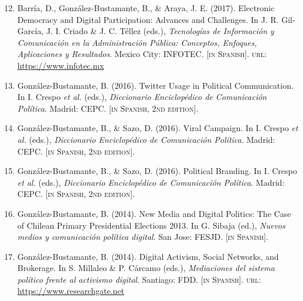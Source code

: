 \documentclass[letterpaper,margin]{res}
\newenvironment{benumerate}[1]{
    \let\oldItem\item
    \def\item{\addtocounter{enumi}{-2}\oldItem}
    \begin{enumerate}
    \setcounter{enumi}{#1}
    \addtocounter{enumi}{1}
}{
    \end{enumerate}
}
\begin{document}
\begin{resume}
\begin{benumerate}{11}
\item{\small Barr\'ia, D., Gonz\'alez-Bustamante, B., \& Araya, J. E. (2017). Electronic Democracy and Digital Participation: Advances and Challenges. In J. R. Gil-Garc\'ia, J. I. Criado \&  J. C. T\'ellez (eds.), {\itshape Tecnolog\'ias de Informaci\'on y Comunicaci\'on en la Administraci\'on P\'ublica: Conceptos, Enfoques, Aplicaciones y Resultados}. Mexico City: INFOTEC. {\footnotesize \scshape [in Spanish]}. {\scshape url}: \href{https://www.infotec.mx/es_mx/infotec/tic_en_la_administracion_publica}{https://www.infotec.mx}}\vspace{1mm}

\item{\small Gonz\'alez-Bustamante, B. (2016). Twitter Usage in Political Communication. In I. Crespo {\itshape et al.} (eds.), {\itshape Diccionario Enciclop\'edico de Comunicaci\'on Pol\'itica}. Madrid: CEPC. {\footnotesize \scshape [in Spanish, 2nd edition]}.}\vspace{1mm}

\item{\small Gonz\'alez-Bustamante, B., \& Sazo, D. (2016). Viral Campaign. In I. Crespo {\itshape et al.} (eds.), {\itshape Diccionario Enciclop\'edico de Comunicaci\'on Pol\'itica}. Madrid: CEPC. {\footnotesize \scshape [in Spanish, 2nd edition]}.}\vspace{1mm}

\item{\small Gonz\'alez-Bustamante, B., \& Sazo, D. (2016). Political Branding. In I. Crespo {\itshape et al.} (eds.), {\itshape Diccionario Enciclop\'edico de Comunicaci\'on Pol\'itica}. Madrid: CEPC. {\footnotesize \scshape [in Spanish, 2nd edition]}.}\vspace{1mm}

\item{\small Gonz\'alez-Bustamante, B. (2014). New Media and Digital Politics: The Case of Chilean Primary Presidential Elections 2013. In G. Sibaja (ed.), {\itshape Nuevos medios y comunicaci\'on pol\'itica digital}. San Jose: FESJD. {\footnotesize \scshape [in Spanish]}.}\vspace{1mm}

\item{\small Gonz\'alez-Bustamante, B. (2014). Digital Activism, Social Networks, and Brokerage. In S. Millaleo \& P. C\'arcamo (eds.), {\itshape Mediaciones del sistema pol\'itico frente al activismo digital}. Santiago: FDD. {\footnotesize \scshape [in Spanish]}. {\scshape url}: \href{https://www.researchgate.net/publication/321992867_Activismo_digital_redes_sociales_e_intermediacion}{https://www.researchgate.net}}\vspace{1mm}


\end{benumerate}
\end{resume}
\end{document}
